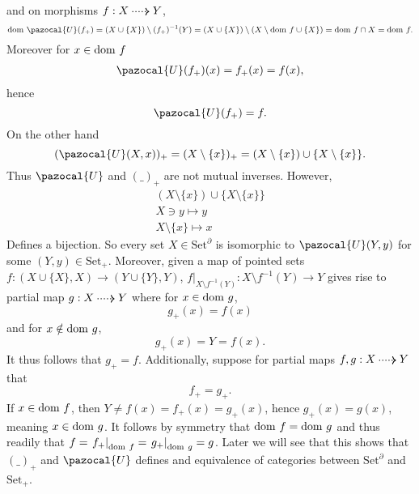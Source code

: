 \begin{example}
$$    $$
    and on morphisms $f : X\dottedarrow Y$, 
    $$
        \dom\ \pazocal{U}(f_{+}) = (X\cup\{X\})\setminus (f_{+})^{-1}(Y) = (X\cup\{X\})\setminus (X\setminus \dom\ f \cup \{X\}) = \dom\ f \cap X = \dom \ f.
    $$ 
    Moreover for $x\in \mathrm{dom} \ f$
    \begin{align*}
        \pazocal{U}(f_{+})(x) = f_{+}(x) = f(x),
    \end{align*}
    hence 
    $$
        \pazocal{U}(f_{+})= f.
    $$
    On the other hand 
    $$
        (\pazocal{U}(X,x))_{+} = (X\setminus \{x\})_{+} = (X\setminus \{x\})\cup\{X\setminus \{x\}\}.
    $$
    Thus $\pazocal{U}$ and $(\_)_{+}$ are not mutual inverses. However, 
    \begin{gather*}
        (X\setminus\{x\})\cup\{X\setminus\{x\}\}\\
        X\ni y\mapsto y\\
        X\setminus \{x\} \mapsto x
    \end{gather*}
    Defines a bijection. So every set $X\in \mathrm{Set}^\partial$ is isomorphic to $\pazocal{U}(Y,y)$ for some $(Y,y)\in \mathrm{Set}_{+}$. Moreover, given a map of pointed sets $f: (X\cup\{X\},X) \rightarrow (Y\cup\{Y\}, Y)$, $\left. f\right|_{X\setminus f^{-1}(Y)} : X\setminus f^{-1}(Y)\rightarrow Y$ gives rise to partial map $g : X\dottedarrow Y$ where for $x\in \mathrm{dom}\ g$,
    $$
        g_{+}(x) = f(x)
    $$
    and for $x\notin \mathrm{dom} \ g$,
    $$
        g_{+}(x) = Y = f(x).
    $$
    It thus follows that $g_{+}= f$. Additionally, suppose for partial maps $f,g : X \dottedarrow Y$  that 
    $$
        f_{+} = g_{+}.
    $$
    If $x\in \mathrm{dom} \ f$, then $Y\neq f(x)=f_{+}(x)=g_{+}(x)$, hence $g_{+}(x)=g(x)$, meaning $x\in \mathrm{dom}\ g$. It follows by symmetry that $\mathrm{dom}\ f = \mathrm{dom} \ g$ and thus readily that $ f= \left. f_{+} \right|_{\mathrm{dom} \ f} = \left. g_{+}\right|_{\mathrm{dom}\ g} = g$. Later we will see that this shows that $(\_)_{+}$ and $\pazocal{U}$ defines and equivalence of categories between $\mathrm{Set}^\partial$ and $\mathrm{Set}_{+}$. 
\end{example}
